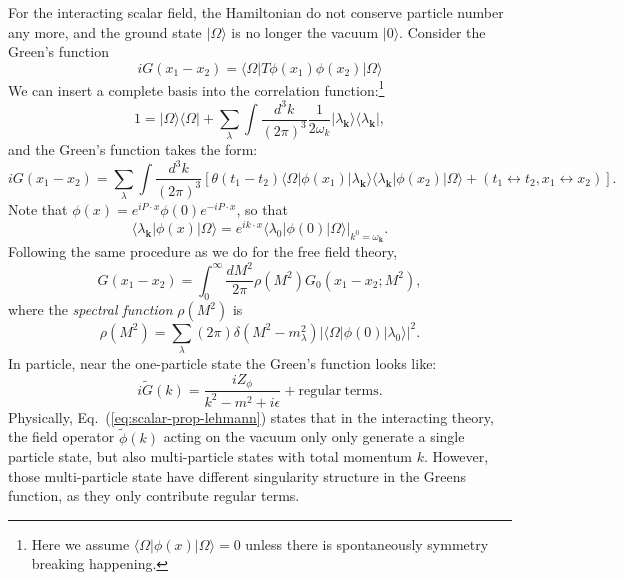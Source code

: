 \documentclass[aps,prb,superscriptaddress,nofootinbib]{revtex4}
\begin{document}
For the interacting scalar field, the Hamiltonian do not conserve particle number any more, and the ground state $|\Omega\rangle$ is no longer the vacuum $|0\rangle$.
Consider the Green's function
\begin{equation}
	iG(x_1-x_2) = \langle\Omega|T\phi(x_1)\phi(x_2)|\Omega\rangle 
\end{equation}
We can insert a complete basis into the correlation function:\footnote{Here we assume $\langle\Omega|\phi(x)|\Omega\rangle=0$ unless there is spontaneously symmetry breaking happening.}
\begin{equation}
	1 = |\Omega\rangle\langle\Omega| + \sum_\lambda\int\frac{d^3 k}{(2\pi)^3}\frac{1}{2\omega_k}|\lambda_{\bm k}\rangle \langle\lambda_{\bm k}|,
\end{equation}
and the Green's function takes the form:
\begin{equation*}
	iG(x_1-x_2) = \sum_\lambda \int\frac{d^3 k}{(2\pi)^3}
	\left[\theta(t_1-t_2)\langle\Omega|\phi(x_1)|\lambda_{\bm k}\rangle\langle\lambda_{\bm k}|\phi(x_2)|\Omega\rangle + (t_1\leftrightarrow t_2, x_1 \leftrightarrow x_2)\right].
\end{equation*}
Note that $\phi(x)=e^{iP\cdot x}\phi(0) e^{-iP\cdot x}$, so that
\begin{equation}
	\langle\lambda_{\bm k}|\phi(x)|\Omega\rangle 
	= e^{ik\cdot x} \left.\langle\lambda_{0}|\phi(0)|\Omega\rangle\right|_{k^0=\omega_{\bm k}}.
\end{equation}
Following the same procedure as we do for the free field theory, 
\begin{equation}
	G(x_1-x_2) = \int_0^\infty \frac{dM^2}{2\pi} \rho(M^2) G_0(x_1-x_2;M^2),
\end{equation}
where the \textit{spectral function} $\rho(M^2)$ is
\begin{equation}
	\rho(M^2) = \sum_\lambda(2\pi)\delta(M^2-m_\lambda^2)|\langle\Omega|\phi(0)|\lambda_0\rangle|^2.
\end{equation}
In particle, near the one-particle state the Green's function looks like:
\begin{equation}\label{eq:scalar-prop-lehmann}
	i\tilde G(k) = \frac{iZ_{\phi}}{k^2-m^2+i\epsilon} + \mathrm{regular\ terms}.
\end{equation}
Physically, Eq.~(\ref{eq:scalar-prop-lehmann}) states that in the interacting theory, the field operator $\tilde\phi(k)$ acting on the vacuum only only generate a single particle state, but also multi-particle states with total momentum $k$.
However, those multi-particle state have different singularity structure in the Greens function, as they only contribute regular terms.
\end{document}
